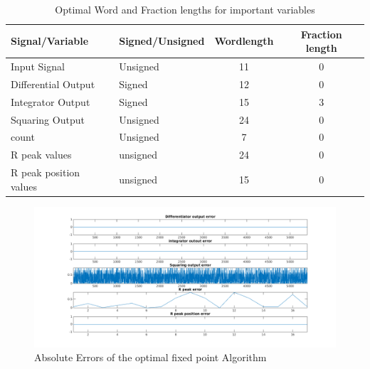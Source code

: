 \documentclass{article}
\begin{document}
\begin{table}
        \centering
        \begin{tabular}{l l c c }
                Signal/Variable & Signed/Unsigned & Wordlength & Fraction length \\
                \hline
                Input Signal & Unsigned & 11 & 0 \\
                Differential Output & Signed & 12 & 0 \\
                Integrator Output & Signed & 15 & 3 \\
                Squaring Output & Unsigned & 24 & 0 \\
                count & Unsigned & 7 & 0 \\
                R peak values & unsigned & 24 & 0 \\
                R peak position values & unsigned & 15 & 0 \\
        \end{tabular}
        \caption{Optimal Word and Fraction lengths for important variables}
        \label{tab:optwords}
\end{table}

\begin{figure}%
        \centerline{\includegraphics[scale=0.6]{./figs/fxpt_errors1.png}}
        \caption{Absolute Errors of the optimal fixed point Algorithm}
        \label{fig:errors}
\end{figure}
\end{document}
